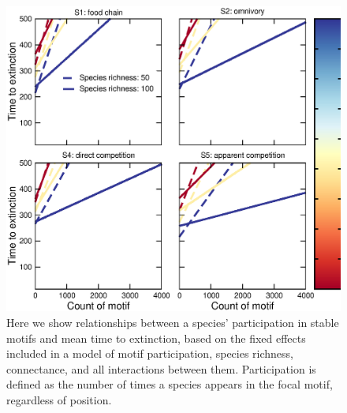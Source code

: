 \documentclass[12pt]{article}
\begin{document}
	\begin{figure}[h!]
		\caption{Here we show relationships between a species' participation in stable motifs and mean time to extinction, based on the fixed effects included in a model of motif participation, species richness, connectance, and all interactions between them. Participation is defined as the number of times a species appears in the focal motif, regardless of position.}
		\label{participation_lmers}
		\includegraphics[width=\textwidth]{figures/extinction_order/motif_lmer_summary_paper_full.eps}
		\end{figure}




\end{document}
